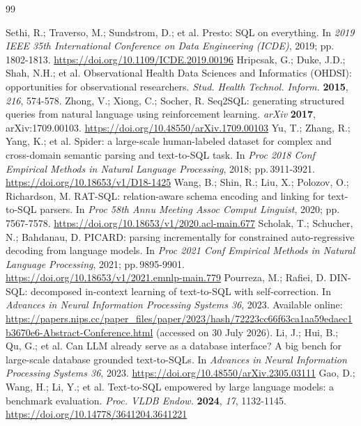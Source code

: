 \documentclass[10pt]{article}
\newcommand{\doilink}[1]{\begingroup\urlstyle{same}\url{#1}\endgroup}
\begin{document}
\begin{thebibliography}{99}\footnotesize

 Sethi, R.; Traverso, M.; Sundstrom, D.; et al. Presto: SQL on everything. In \textit{2019 IEEE 35th International Conference on Data Engineering (ICDE)}, 2019; pp.\,1802-1813. \doilink{https://doi.org/10.1109/ICDE.2019.00196}
 Hripcsak, G.; Duke, J.D.; Shah, N.H.; et al. Observational Health Data Sciences and Informatics (OHDSI): opportunities for observational researchers. \textit{Stud. Health Technol. Inform.} \textbf{2015}, \textit{216}, 574-578. 
 Zhong, V.; Xiong, C.; Socher, R. Seq2SQL: generating structured queries from natural language using reinforcement learning. \textit{arXiv} \textbf{2017}, arXiv:1709.00103. \doilink{https://doi.org/10.48550/arXiv.1709.00103}
 Yu, T.; Zhang, R.; Yang, K.; et al. Spider: a large-scale human-labeled dataset for complex and cross-domain semantic parsing and text-to-SQL task. In \textit{Proc 2018 Conf Empirical Methods in Natural Language Processing}, 2018; pp.\,3911-3921. \doilink{https://doi.org/10.18653/v1/D18-1425}
 Wang, B.; Shin, R.; Liu, X.; Polozov, O.; Richardson, M. RAT-SQL: relation-aware schema encoding and linking for text-to-SQL parsers. In \textit{Proc 58th Annu Meeting Assoc Comput Linguist}, 2020; pp.\,7567-7578. \doilink{https://doi.org/10.18653/v1/2020.acl-main.677}
 Scholak, T.; Schucher, N.; Bahdanau, D. PICARD: parsing incrementally for constrained auto-regressive decoding from language models. In \textit{Proc 2021 Conf Empirical Methods in Natural Language Processing}, 2021; pp.\,9895-9901. \doilink{https://doi.org/10.18653/v1/2021.emnlp-main.779}
 Pourreza, M.; Rafiei, D. DIN-SQL: decomposed in-context learning of text-to-SQL with self-correction. In \textit{Advances in Neural Information Processing Systems 36}, 2023. Available online: \url{https://papers.nips.cc/paper_files/paper/2023/hash/72223cc66f63ca1aa59edaec1b3670e6-Abstract-Conference.html} (accessed on 30 July 2026). 
 Li, J.; Hui, B.; Qu, G.; et al. Can LLM already serve as a database interface? A big bench for large-scale database grounded text-to-SQLs. In \textit{Advances in Neural Information Processing Systems 36}, 2023. \doilink{https://doi.org/10.48550/arXiv.2305.03111}
 Gao, D.; Wang, H.; Li, Y.; et al. Text-to-SQL empowered by large language models: a benchmark evaluation. \textit{Proc. VLDB Endow.} \textbf{2024}, \textit{17}, 1132-1145. \doilink{https://doi.org/10.14778/3641204.3641221}

\end{thebibliography}
\end{document}
